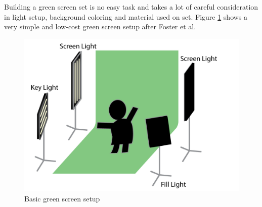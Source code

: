 Building a green screen set is no easy task and takes a lot of careful 
consideration in light setup, background coloring and material used on set. 
\newline
Figure \ref{fig:appendix:gs-setup} shows a very simple and low-cost green 
screen setup after Foster et al. \cite{foster:greenscreen:2010}

\begin{figure}[htb]
	\centering
	\includegraphics[width=\textwidth]{gfx/appendix/gs-setup.png}
	\caption{Basic green screen setup}
	\label{fig:appendix:gs-setup}
\end{figure}

\endgroup